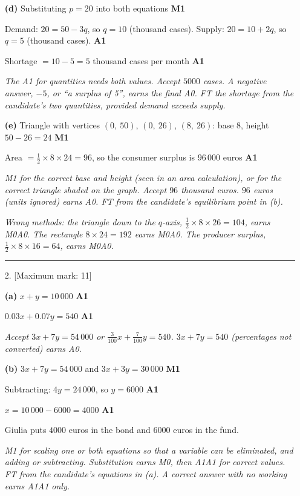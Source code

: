 \documentclass[12pt, twoside]{article}
\begin{document}
\begin{enumerate}[itemsep=0.3cm]
\textbf{(d)} Substituting $p = 20$ into both equations \hfill \textbf{M1}

Demand: $20 = 50 - 3q$, so $q = 10$ (thousand cases). Supply:
$20 = 10 + 2q$, so $q = 5$ (thousand cases). \hfill \textbf{A1}

Shortage $= 10 - 5 = 5$ thousand cases per month \hfill \textbf{A1}

\emph{The A1 for quantities needs both values. Accept $5000$ cases. A
negative answer, $-5$, or ``a surplus of 5'', earns the final A0. FT the
shortage from the candidate's two quantities, provided demand exceeds
supply.}

\textbf{(e)} Triangle with vertices $(0,\ 50)$, $(0,\ 26)$, $(8,\ 26)$:
base $8$, height $50 - 26 = 24$ \hfill \textbf{M1}

Area $= \frac{1}{2} \times 8 \times 24 = 96$, so the consumer surplus is
$96\,000$ euros \hfill \textbf{A1}

\emph{M1 for the correct base and height (seen in an area calculation),
or for the correct triangle shaded on the graph. Accept $96$ thousand
euros. $96$ euros (units ignored) earns A0. FT from the candidate's
equilibrium point in (b).}

\emph{Wrong methods: the triangle down to the $q$-axis,
$\frac{1}{2} \times 8 \times 26 = 104$, earns M0A0. The rectangle
$8 \times 24 = 192$ earns M0A0. The producer surplus,
$\frac{1}{2} \times 8 \times 16 = 64$, earns M0A0.}

\bigskip \hrule \bigskip

\item[2.] [Maximum mark: 11]

\textbf{(a)} $x + y = 10\,000$ \hfill \textbf{A1}

$0.03x + 0.07y = 540$ \hfill \textbf{A1}

\emph{Accept $3x + 7y = 54\,000$ or $\frac{3}{100}x + \frac{7}{100}y = 540$.
$3x + 7y = 540$ (percentages not converted) earns A0.}

\textbf{(b)} $3x + 7y = 54\,000$ and $3x + 3y = 30\,000$ \hfill \textbf{M1}

Subtracting: $4y = 24\,000$, so $y = 6000$ \hfill \textbf{A1}

$x = 10\,000 - 6000 = 4000$ \hfill \textbf{A1}

Giulia puts $4000$ euros in the bond and $6000$ euros in the fund.

\emph{M1 for scaling one or both equations so that a variable can be
eliminated, and adding or subtracting. Substitution earns M0, then
A1A1 for correct values. FT from the candidate's equations in (a). A
correct answer with no working earns A1A1 only.}


\end{enumerate}
\end{document}
